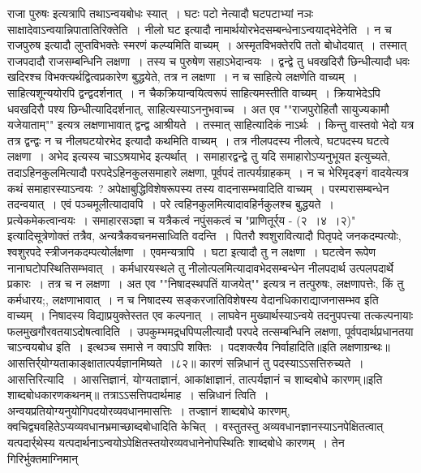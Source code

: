 राजा पुरुषः इत्यत्रापि तथाऽन्वयबोधः स्यात्~। घटः पटो नेत्यादौ घटपटाभ्यां नञः साक्षादेवाऽन्वयान्निपातातिरिक्तेति~। नीलो घट इत्यादौ नामार्थयोरभेदसम्बन्धेनाऽन्वयाद्भेदेनेति~।
न च राजपुरुष इत्यादौ लुप्तविभक्तेः स्मरणं कल्प्यमिति वाच्यम्~। अस्मृतविभक्तेरपि ततो बोधोदयात्~। तस्मात् राजपदादौ राजसम्बन्धिनि लक्षणा~। तस्य च पुरुषेण
सहाऽभेदान्वयः~।
द्वन्द्वे तु धवखदिरौ छिन्धीत्यादौ धवः खदिरश्च विभक्त्यर्थद्वित्वप्रकारेण बुद्धयेते, तत्र न लक्षणा~। न च साहित्ये लक्षणेति वाच्यम्~। साहित्यशून्ययोरपि द्वन्द्वदर्शनात्~।
न चैकक्रियान्वयित्वरूपं साहित्यमस्तीति वाच्यम्~। क्रियाभेदेऽपि धवखदिरौ पश्य छिन्धीत्यादिदर्शनात्, साहित्यस्याऽननुभवाच्च~। अत एव ""राजपुरोहितौ सायुज्यकामौ
यजेयाताम्"" इत्यत्र लक्षणाभावात् द्वन्द्व आश्रीयते~। तस्मात् साहित्यादिकं नाऽर्थः~। किन्तु वास्तवो भेदो यत्र तत्र द्वन्द्वः न च नीलघटयोरभेद इत्यादौ कथमिति वाच्यम्~। तत्र
नीलपदस्य नीलत्वे, घटपदस्य घटत्वे लक्षणा~। अभेद इत्यस्य चाऽऽश्रयाभेद इत्यर्थात्~।
समाहारद्वन्द्वे तु यदि समाहारोऽप्यनुभूयत इत्युच्यते, तदाऽहिनकुलमित्यादौ परपदेऽहिनकुलसमाहारे लक्षणा, पूर्वपदं तात्पर्यग्राहकम्~। न च भेरिमृदङ्गं वादयेत्यत्र
कथं समाहारस्याऽन्वयः~? अपेक्षाबुद्धिविशेषरूपस्य तस्य वादनासम्भवादिति वाच्यम्~। परम्परासम्बन्धेन तदन्वयात्~। एवं पञ्चमूलीत्यादावपि~।
परे त्वहिनकुलमित्यादावहिर्नकुलश्च बुद्धयते~। प्रत्येकमेकत्वान्वयः~। समाहारसञ्ज्ञा च यत्रैकत्वं नपुंसकत्वं च "प्राणितूर्र्य - (२~।४~।२)" इत्यादिसूत्रेणोक्तं तत्रैव,
अन्यत्रैकवचनमसाध्विति वदन्ति~।
पितरौ श्वशुरावित्यादौ पितृपदे जनकदम्पत्योः, श्वशुरपदे स्त्रीजनकदम्पत्योर्लक्षणा~। एवमन्यत्रापि~। घटा इत्यादौ तु न लक्षणा~। घटत्वेन रूपेण नानाघटोपस्थितिसम्भवात्~।
कर्मधारयस्थले तु नीलोत्पलमित्यादावभेदसम्बन्धेन नीलपदार्थ उत्पलपदार्थे प्रकारः~। तत्र च न लक्षणा~। अत एव ""निषादस्थपतिं याजयेत्"" इत्यत्र न तत्पुरुषः,
लक्षणापत्तेः, किं तु कर्मधारय;, लक्षणाभावात्~। न च निषादस्य सङ्करजातिविशेषस्य वेदानधिकाराद्याजनासम्भव इति वाच्यम्~। निषादस्य विद्याप्रयुक्तेस्तत एव
कल्पनात्~। लाघवेन मुख्यार्थस्याऽन्वये तदनुपपत्त्या तत्कल्पनायाः फलमुखगौरवतयाऽदोषत्वादिति~।
उपकुम्भमद्र्धपिप्पलीत्यादौ परपदे तत्सम्बन्धिनि लक्षणा, पूर्वपदार्थप्रधानतया चाऽन्वयबोध इति~।
इत्थञ्च समासे न क्वाऽपि शक्तिः~। पदशक्त्यैव निर्वाहादिति॥इति लक्षणाग्रन्थः॥
आसत्तिर्र्योग्यताकाङ्क्षातात्पर्यज्ञानमिष्यते~।८२॥
कारणं सन्निधानं तु पदस्याऽऽसत्तिरुच्यते~।
आसत्तिरित्यादि~। आसत्तिज्ञानं, योग्यताज्ञानं, आकांक्षाज्ञानं, तात्पर्यज्ञानं च शाब्दबोधे कारणम्॥इति शाब्दबोधकारणकथनम्॥
तत्राऽऽसत्तिपदार्थमाह~। सन्निधानं त्विति~। अन्वयप्रतियोग्यनुयोगिपदयोरव्यवधानमासत्तिः~। तज्ज्ञानं शाब्दबोधे कारणम्, क्वचिद्व्यवहितेऽप्यव्यवधानभ्रमाच्छाब्दबोधादिति
केचित्~। वस्तुतस्तु अव्यवधानज्ञानस्याऽनपेक्षितत्वात् यत्पदार्र्थेस्य यत्पदार्थनाऽन्वयोऽपेक्षितस्तयोरव्यवधानेनोपस्थितिः शाब्दबोधे कारणम्~। तेन गिरिर्भुक्तमाग्निमान्

